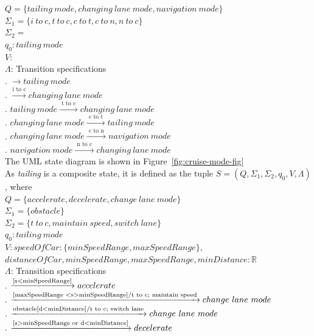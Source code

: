 \documentclass[12pt]{article}
\begin{document}
\begin{spacing}{1.5}
\noindent $Q = \{tailing~mode, changing~lane~mode, navigation~mode\}$\\
\noindent $\Sigma_1 = \{i~to~c, t~to~c, c~to~t, c~to~n, n~to~c\}$\\
\noindent $\Sigma_2 = $\\
\noindent $q_0: tailing~mode$\\
\noindent $V: $\\
\noindent $\Lambda$: Transition specifications\\
. $\rightarrow tailing~mode$\\
. $\xrightarrow {\text{i to c}} changing~lane~mode$\\
. $tailing~mode \xrightarrow {\text { t to c }} changing~lane~mode$\\
. $changing~lane~mode \xrightarrow {\text { c to t }} tailing~mode$\\
. $changing~lane~mode \xrightarrow {\text { c to n }} navigation~mode$\\
. $navigation~mode \xrightarrow {\text { n to c }} changing~lane~mode$\\

\noindent The UML state diagram is shown in Figure~\ref{fig:cruise-mode-fig}\\


\noindent As \textit{tailing} is a composite state, it is defined as the tuple $S = (Q, \Sigma_1, \Sigma_2, q_0, V, \Lambda)$, where\\

\noindent $Q = \{accelerate, decelerate, change~lane~mode\}$\\
\noindent $\Sigma_1 = \{obstacle\}$\\
\noindent $\Sigma_2 = \{t~to~c, maintain~speed, switch~lane\}$\\
\noindent $q_0: tailing~mode$\\
\noindent $V: speedOfCar : \{minSpeedRange, maxSpeedRange\},$\\
\indent $distanceOfCar, minSpeedRange, maxSpeedRange, minDistance: \mathbb{R} $\\
\noindent $\Lambda$: Transition specifications\\
. $\xrightarrow {\text{[s\textless minSpeedRange]}} accelerate$\\
. $\xrightarrow {\text{[maxSpeedRange \textless s\textgreater minSpeedRange]/t to c; maintain speed}} change~lane~mode$\\
. $\xrightarrow {\text{obstacle[d\textless minDistance]/t to c; switch lane}} change~lane~mode$\\
. $\xrightarrow {\text{[s\textgreater minSpeedRange or d\textless minDistance]}} decelerate$\\


\end{spacing}
\end{document}
